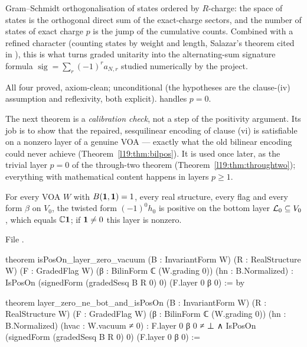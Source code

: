 \begin{physics}
Gram--Schmidt orthogonalisation of states ordered by $R$-charge: the space of states is the
orthogonal direct sum of the exact-charge sectors, and the number of states of exact charge $p$ is
the jump of the cumulative counts. Combined with a refined character (counting states by weight and
length, Salazar's theorem cited in ), this is what turns graded unitarity
into the alternating-sum signature formula $\operatorname{sig} = \sum_r(-1)^ra_{N,r}$ studied
numerically by the project.
\end{physics}

\begin{status}
All four proved, axiom-clean; unconditional (the hypotheses are the clause-(iv) assumption and
reflexivity, both explicit).  handles $p = 0$.
\end{status}

The next theorem is a \emph{calibration check}, not a step of the positivity argument. Its job is to show that
the repaired, sesquilinear encoding of clause (vi) is satisfiable on a nonzero layer of a genuine VOA --- exactly
what the old bilinear encoding could never achieve (Theorem~\ref{l19:thm:bilpos}). It is used once later, as the
trivial layer $p=0$ of the through-two theorem (Theorem~\ref{l19:thm:throughtwo}); everything with mathematical
content happens in layers $p\ge1$.

\begin{theorem}\label{l19:thm:vacuum}
For every VOA $W$ with $B(\mathbf{1},\mathbf{1}) = 1$, every real structure, every flag and every
form $\beta$ on $V_0$, the twisted form $(-1)^0h_0$ is positive on the bottom layer
$\mathcal{L}_0\subseteq V_0$, which equals ${\mathbb{C}}\mathbf{1}$; if $\mathbf{1}\ne0$ this layer is nonzero.
\end{theorem}

\noindent File .
\begin{leancode}
theorem isPosOn_layer_zero_vacuum (B : InvariantForm W) (R : RealStructure W) (F : GradedFlag W)
    (β : BilinForm ℂ (W.grading 0)) (hn : B.Normalized) :
    IsPosOn (signedForm (gradedSesq B R 0) 0) (F.layer 0 β 0) := by

theorem layer_zero_ne_bot_and_isPosOn (B : InvariantForm W) (R : RealStructure W)
    (F : GradedFlag W) (β : BilinForm ℂ (W.grading 0)) (hn : B.Normalized)
    (hvac : W.vacuum ≠ 0) :
    F.layer 0 β 0 ≠ ⊥ ∧ IsPosOn (signedForm (gradedSesq B R 0) 0) (F.layer 0 β 0) :=
\end{leancode}

